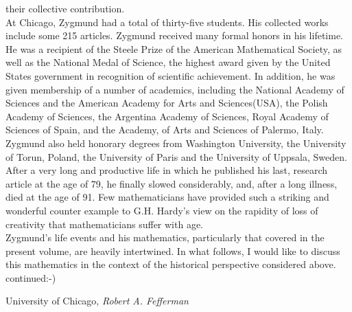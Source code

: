 their collective contribution.\\
\indent At Chicago, Zygmund had a total of thirty-five students. His collected works include some 215 articles. 
Zygmund received many formal honors in his lifetime. He was a recipient of the Steele Prize of the American 
Mathematical Society, as well as the National Medal of Science, the highest award given by the United States 
government in recognition of scientific achievement. In addition, he was given membership of a number of academics, 
including the National Academy of Sciences and the American Academy for Arts and Sciences(USA), the Polish 
Academy of Sciences, the Argentina Academy of Sciences, Royal Academy of Sciences of Spain, and the Academy, 
of Arts and Sciences of Palermo, Italy. Zygmund also held honorary degrees from Washington University, the 
University of Torun, Poland, the University of Paris and the University of Uppsala, Sweden.\\
\indent After a very long and productive life in which he published his last, research article at the age of 
79, he finally slowed considerably, and, after a long illness, died at the age of 91. Few mathematicians have 
provided such a striking and wonderful counter example to G.H. Hardy's view on the rapidity of loss of creativity 
that mathematicians suffer with age.\\
\indent Zygmund's life events and his mathematics, particularly that covered in the present volume, are heavily 
intertwined. In what follows, I would like to discuss this mathematics in the context of the historical perspective 
considered above.\\
\indent continued:-)






\vspace{\baselineskip}
\begin{flushright}\noindent
University of Chicago, \hfill {\it Robert A. Fefferman}\\
\end{flushright}


